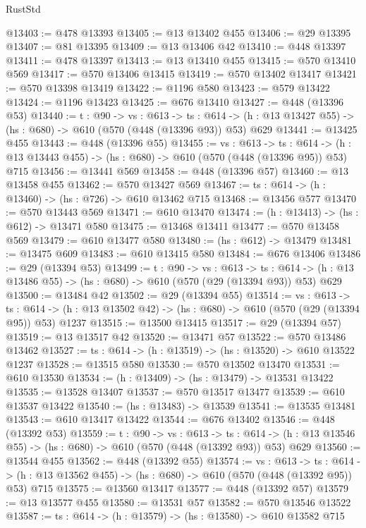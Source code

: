 \begin{lexlean}{RustStd}
\begin{coremodule}
@13403 := @478 @13393
@13405 := @13 @13402 @455
@13406 := @29 @13395
@13407 := @81 @13395
@13409 := @13 @13406 @42
@13410 := @448 @13397
@13411 := @478 @13397
@13413 := @13 @13410 @455
@13415 := @570 @13410 @569
@13417 := @570 @13406 @13415
@13419 := @570 @13402 @13417
@13421 := @570 @13398 @13419
@13422 := @1196 @580
@13423 := @579 @13422
@13424 := @1196 @13423
@13425 := @676 @13410
@13427 := @448 (@13396 @53)
@13440 := {t : @90} ->
  {vs : @613} ->
  {ts : @614} -> (h : @13 @13427 @55) -> (hs : @680) -> @610 (@570 (@448 (@13396 @93)) @53) @629
@13441 := @13425 @455
@13443 := @448 (@13396 @55)
@13455 := {vs : @613} ->
  {ts : @614} -> (h : @13 @13443 @455) -> (hs : @680) -> @610 (@570 (@448 (@13396 @95)) @53) @715
@13456 := @13441 @569
@13458 := @448 (@13396 @57)
@13460 := @13 @13458 @455
@13462 := @570 @13427 @569
@13467 := {ts : @614} -> (h : @13460) -> (hs : @726) -> @610 @13462 @715
@13468 := @13456 @577
@13470 := @570 @13443 @569
@13471 := @610 @13470
@13474 := (h : @13413) -> (hs : @612) -> @13471 @580
@13475 := @13468 @13411
@13477 := @570 @13458 @569
@13479 := @610 @13477 @580
@13480 := (hs : @612) -> @13479
@13481 := @13475 @609
@13483 := @610 @13415 @580
@13484 := @676 @13406
@13486 := @29 (@13394 @53)
@13499 := {t : @90} ->
  {vs : @613} ->
  {ts : @614} -> (h : @13 @13486 @55) -> (hs : @680) -> @610 (@570 (@29 (@13394 @93)) @53) @629
@13500 := @13484 @42
@13502 := @29 (@13394 @55)
@13514 := {vs : @613} ->
  {ts : @614} -> (h : @13 @13502 @42) -> (hs : @680) -> @610 (@570 (@29 (@13394 @95)) @53) @1237
@13515 := @13500 @13415
@13517 := @29 (@13394 @57)
@13519 := @13 @13517 @42
@13520 := @13471 @57
@13522 := @570 @13486 @13462
@13527 := {ts : @614} -> (h : @13519) -> (hs : @13520) -> @610 @13522 @1237
@13528 := @13515 @580
@13530 := @570 @13502 @13470
@13531 := @610 @13530
@13534 := (h : @13409) -> (hs : @13479) -> @13531 @13422
@13535 := @13528 @13407
@13537 := @570 @13517 @13477
@13539 := @610 @13537 @13422
@13540 := (hs : @13483) -> @13539
@13541 := @13535 @13481
@13543 := @610 @13417 @13422
@13544 := @676 @13402
@13546 := @448 (@13392 @53)
@13559 := {t : @90} ->
  {vs : @613} ->
  {ts : @614} -> (h : @13 @13546 @55) -> (hs : @680) -> @610 (@570 (@448 (@13392 @93)) @53) @629
@13560 := @13544 @455
@13562 := @448 (@13392 @55)
@13574 := {vs : @613} ->
  {ts : @614} -> (h : @13 @13562 @455) -> (hs : @680) -> @610 (@570 (@448 (@13392 @95)) @53) @715
@13575 := @13560 @13417
@13577 := @448 (@13392 @57)
@13579 := @13 @13577 @455
@13580 := @13531 @57
@13582 := @570 @13546 @13522
@13587 := {ts : @614} -> (h : @13579) -> (hs : @13580) -> @610 @13582 @715

\end{coremodule}
\end{lexlean}
